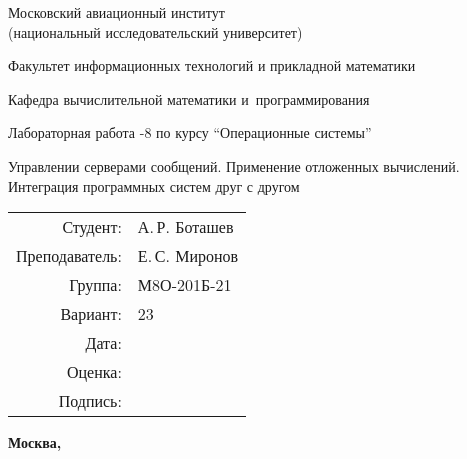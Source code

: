 \documentclass[pdf, unicode, 12pt, a4paper,oneside,fleqn]{article}
\begin{document}
\begin{titlepage}
    \begin{center}
        \bfseries

        {\Large Московский авиационный институт\\ (национальный исследовательский университет)}
        
        \vspace{48pt}
        
        {\large Факультет информационных технологий и прикладной математики}
        
        \vspace{36pt}
        
        {\large Кафедра вычислительной математики и~программирования}
        
        \vspace{48pt}
        
        Лабораторная работа -8 по курсу \enquote{Операционные системы}

        \vspace{48pt}

        Управлении серверами сообщений. Применение отложенных вычислений. Интеграция программных систем друг с другом
        
    \end{center}
    
    \vspace{125pt}
    
    \begin{flushright}
    \begin{tabular}{rl}
    Студент: & А.\,Р. Боташев \\
    Преподаватель: & Е.\,С. Миронов \\
    Группа: & М8О-201Б-21 \\
    Вариант: & 23 \\
    Дата: & \\
    Оценка: & \\
    Подпись: & \\
    \end{tabular}
    \end{flushright}
    
    \vfill
    
    \begin{center}
    \bfseries
    Москва, \the\year
    \end{center}
\end{titlepage}
    
\pagebreak
\end{document}
